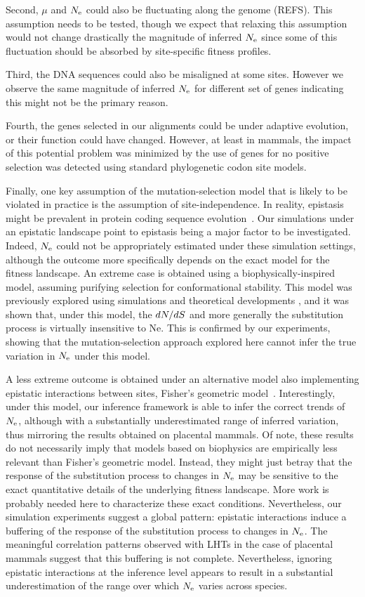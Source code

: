 Second, $\mu$ and $N_{\text{e}}$ could also be fluctuating along the genome (REFS).
This assumption needs to be tested, though we expect that relaxing this assumption would not change drastically the magnitude of inferred $N_{\text{e}}$ since some of this fluctuation should be absorbed by site-specific fitness profiles.

Third, the DNA sequences could also be misaligned at some sites.
However we observe the same magnitude of inferred $N_{\text{e}}$ for different set of genes indicating this might not be the primary reason.

Fourth, the genes selected in our alignments could be under adaptive evolution, or their function could have changed.
However, at least in mammals, the impact of this potential problem was minimized by the use of genes for no positive selection was detected using standard phylogenetic codon site models.

Finally, one key assumption of the mutation-selection model that is likely to be violated in practice is the assumption of site-independence.
In reality, epistasis might be prevalent in protein coding sequence evolution~\citep{Pollock2014,Shah2015}.
Our simulations under an epistatic landscape point to epistasis being a major factor to be investigated.
Indeed, $N_{\text{e}}$ could not be appropriately estimated under these simulation settings, although the outcome more specifically depends on the exact model for the fitness landscape.
An extreme case is obtained using a biophysically-inspired model, assuming purifying selection for conformational stability.
This model was previously explored using simulations and theoretical developments \citet{Goldstein2013}, and it was shown that, under this model, the $dN/dS$ and more generally the substitution process is virtually insensitive to Ne.
This is confirmed by our experiments, showing that the mutation-selection approach explored here cannot infer the true variation in $N_{\text{e}}$ under this model.

A less extreme outcome is obtained under an alternative model also implementing epistatic interactions between sites, Fisher’s geometric model~\citep{Tenaillon2014,Blanquart2016}.
Interestingly, under this model, our inference framework is able to infer the correct trends of $N_{\text{e}}$, although with a substantially underestimated range of inferred variation, thus mirroring the results obtained on placental mammals.
Of note, these results do not necessarily imply that models based on biophysics are empirically less relevant than Fisher’s geometric model.
Instead, they might just betray that the response of the substitution process to changes in $N_{\text{e}}$ may be sensitive to the exact quantitative details of the underlying fitness landscape.
More work is probably needed here to characterize these exact conditions.
Nevertheless, our simulation experiments suggest a global pattern: epistatic interactions induce a buffering of the response of the substitution process to changes in $N_{\text{e}}$.
The meaningful correlation patterns observed with LHTs in the case of placental mammals suggest that this buffering is not complete.
Nevertheless, ignoring epistatic interactions at the inference level appears to result in a substantial underestimation of the range over which $N_{\text{e}}$ varies across species.


